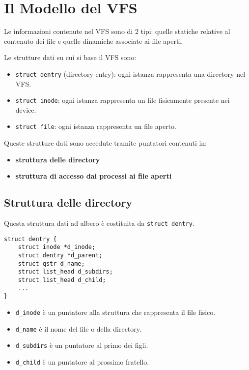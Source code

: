 \documentclass[12pt, a4paper]{report}
\begin{document}
\chapter{Il Modello del VFS}
Le informazioni contenute nel VFS sono di 2 tipi: quelle statiche relative al
contenuto dei file e quelle dinamiche associate ai file aperti.

Le strutture dati su cui si base il VFS sono:
\begin{itemize}
	\item \texttt{struct dentry} (directory entry): ogni istanza rappresenta una
		directory nel VFS.
	\item \texttt{struct inode}: ogni istanza rappresenta un file fisicamente
		presente nei device.
	\item \texttt{struct file}: ogni istanza rappresenta un file aperto.
\end{itemize}
Queste strutture dati sono accedute tramite puntatori contenuti in:
\begin{itemize}
	\item \textbf{struttura delle directory}
	\item \textbf{struttura di accesso dai processi ai file aperti}
\end{itemize}

\section{Struttura delle directory}
Questa struttura dati ad albero è costituita da \texttt{struct dentry}.
\begin{verbatim}
struct dentry {
    struct inode *d_inode;
    struct dentry *d_parent;
    struct qstr d_name;
    struct list_head d_subdirs;
    struct list_head d_child;
    ...
}
\end{verbatim}
\begin{itemize}
	\item \texttt{d\_inode} è un puntatore alla struttura che rappresenta il
		file fisico.
	\item \texttt{d\_name} è il nome del file o della directory.
	\item \texttt{d\_subdirs} è un puntatore al primo dei figli.
	\item \texttt{d\_child} è un puntatore al prossimo fratello.
\end{itemize}
\end{document}
